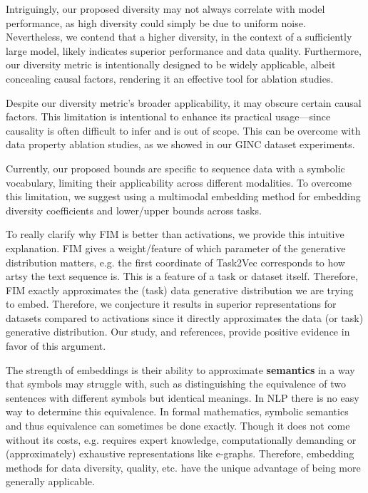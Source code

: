 \documentclass[10pt]{article} %
\begin{document}
Intriguingly, our proposed diversity may not always correlate with model performance, as high diversity could simply be due to uniform noise. 
Nevertheless, we contend that a higher diversity, in the context of a sufficiently large model, likely indicates superior performance and data quality. 
Furthermore, our diversity metric is intentionally designed to be widely applicable, albeit concealing causal factors, rendering it an effective tool for ablation studies.

Despite our diversity metric's broader applicability, it may obscure certain causal factors. 
This limitation is intentional to enhance its practical usage---since causality is often difficult to infer and is out of scope.
This can be overcome with data property ablation studies, as we showed in our GINC dataset experiments. 

Currently, our proposed bounds are specific to sequence data with a symbolic vocabulary, limiting their applicability across different modalities. 
To overcome this limitation, we suggest using a multimodal embedding method for embedding diversity coefficients and lower/upper bounds across tasks.

To really clarify why FIM is better than activations, we provide this intuitive explanation. FIM gives a weight/feature of which parameter of the generative distribution matters, 
e.g. the first coordinate of Task2Vec corresponds to how artsy the text sequence is. 
This is a feature of a task or dataset itself. Therefore, FIM exactly approximates the (task) data generative distribution we are trying to embed. 
Therefore, we conjecture it results in superior representations for datasets compared to activations since it directly approximates the data (or task) generative distribution.
Our study, and references, provide positive evidence in favor of this argument.

The strength of embeddings is their ability to approximate \textbf{semantics} in a way that symbols may struggle with, such as distinguishing the equivalence of two sentences with different symbols but identical meanings. 
In NLP there is no easy way to determine this equivalence. In formal mathematics, symbolic semantics and thus equivalence can sometimes be done exactly. 
Though it does not come without its costs, e.g. requires expert knowledge, computationally demanding or (approximately) exhaustive representations like e-graphs. 
Therefore, embedding methods for data diversity, quality, etc. have the unique advantage of being more generally applicable. 
\end{document}
